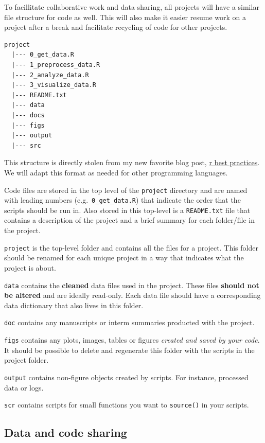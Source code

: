 \documentclass[
]{book}
\begin{document}
To facillitate collaborative work and data sharing, all projects will have a similar file structure for code as well. This will also make it easier resume work on a project after a break and facilitate recycling of code for other projects.

\begin{verbatim}
project 
  |--- 0_get_data.R
  |--- 1_preprocess_data.R
  |--- 2_analyze_data.R
  |--- 3_visualize_data.R
  |--- README.txt
  |--- data
  |--- docs
  |--- figs
  |--- output
  |--- src
\end{verbatim}

This structure is directly stolen from my new favorite blog post, \href{https://kdestasio.github.io/post/r_best_practices/}{r best practices}. We will adapt this format as needed for other programming languages.

Code files are stored in the top level of the \texttt{project} directory and are named with leading numbers (e.g.~\texttt{0\_get\_data.R}) that indicate the order that the scripts should be run in. Also stored in this top-level is a \texttt{README.txt} file that contains a description of the project and a brief summary for each folder/file in the project.

\texttt{project} is the top-level folder and contains all the files for a project. This folder should be renamed for each unique project in a way that indicates what the project is about.

\texttt{data} contains the \textbf{cleaned} data files used in the project. These files \textbf{should not be altered} and are ideally read-only. Each data file should have a corresponding data dictionary that also lives in this folder.

\texttt{doc} contains any manuscripts or interm summaries producted with the project.

\texttt{figs} contains any plots, images, tables or figures \emph{created and saved by your code}. It should be possible to delete and regenerate this folder with the scripts in the project folder.

\texttt{output} contains non-figure objects created by scripts. For instance, processed data or logs.

\texttt{scr} contains scripts for small functions you want to \texttt{source()} in your scripts.

\hypertarget{data-and-code-sharing}{%
\subsection{Data and code sharing}\label{data-and-code-sharing}}
\end{document}
